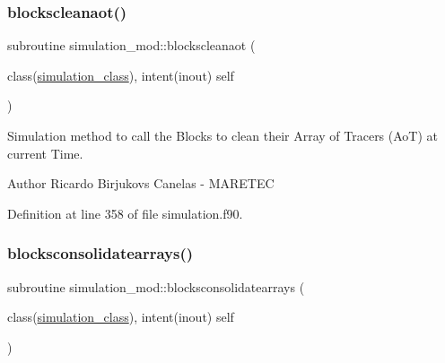 \subsubsection{\texorpdfstring{blockscleanaot()}{blockscleanaot()}}
{\footnotesize\ttfamily subroutine simulation\+\_\+mod\+::blockscleanaot (\begin{DoxyParamCaption}\item[{class(\mbox{\hyperlink{structsimulation__mod_1_1simulation__class}{simulation\+\_\+class}}), intent(inout)}]{self }\end{DoxyParamCaption})\hspace{0.3cm}{\ttfamily [private]}}



Simulation method to call the Blocks to clean their Array of Tracers (AoT) at current Time. 

\begin{DoxyAuthor}{Author}
Ricardo Birjukovs Canelas -\/ M\+A\+R\+E\+T\+EC 
\end{DoxyAuthor}


Definition at line 358 of file simulation.\+f90.


\mbox{\label{namespacesimulation__mod_ac838d4afe33303dc49a5790ca957baa1}} 
\subsubsection{\texorpdfstring{blocksconsolidatearrays()}{blocksconsolidatearrays()}}
{\footnotesize\ttfamily subroutine simulation\+\_\+mod\+::blocksconsolidatearrays (\begin{DoxyParamCaption}\item[{class(\mbox{\hyperlink{structsimulation__mod_1_1simulation__class}{simulation\+\_\+class}}), intent(inout)}]{self }\end{DoxyParamCaption})\hspace{0.3cm}{\ttfamily [private]}}



